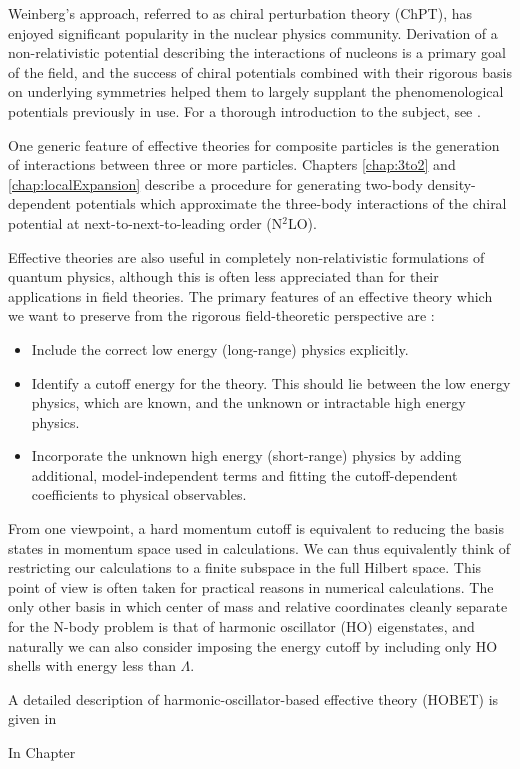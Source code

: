 Weinberg's approach, referred to as chiral perturbation theory (ChPT), has enjoyed significant popularity in the nuclear physics community. Derivation of a non-relativistic potential describing the interactions of nucleons is a primary goal of the field, and the success of chiral potentials combined with their rigorous basis on underlying symmetries helped them to largely supplant the phenomenological potentials previously in use. For a thorough introduction to the subject, see \cite{Machleidt20111}.

One generic feature of effective theories for composite particles is the generation of interactions between three or more particles. Chapters \ref{chap:3to2} and \ref{chap:localExpansion} describe a procedure for generating two-body density-dependent potentials which approximate the three-body interactions of the chiral potential at next-to-next-to-leading order (N$^2$LO).

Effective theories are also useful in completely non-relativistic formulations of quantum physics, although this is often less appreciated than for their applications in field theories. The primary features of an effective theory which we want to preserve from the rigorous field-theoretic perspective are \cite{Lepage:1997}:
\begin{itemize}
\item Include the correct low energy (long-range) physics explicitly. 
\item Identify a cutoff energy for the theory. This should lie between the low energy physics, which are known, and the unknown or intractable high energy physics. 
\item Incorporate the unknown high energy (short-range) physics by adding additional, model-independent terms and fitting the cutoff-dependent coefficients to physical observables.
\end{itemize}

From one viewpoint, a hard momentum cutoff is equivalent to reducing the basis states in momentum space used in calculations. We can thus equivalently think of restricting our calculations to a finite subspace in the full Hilbert space. This point of view is often taken for practical reasons in numerical calculations. The only other basis in which center of mass and relative coordinates cleanly separate for the N-body problem is that of harmonic oscillator (HO) eigenstates, and naturally we can also consider imposing the energy cutoff by including only HO shells with energy less than $\Lambda$. 

A detailed description of harmonic-oscillator-based effective theory (HOBET) is given in \cite{HOBET}


In Chapter 